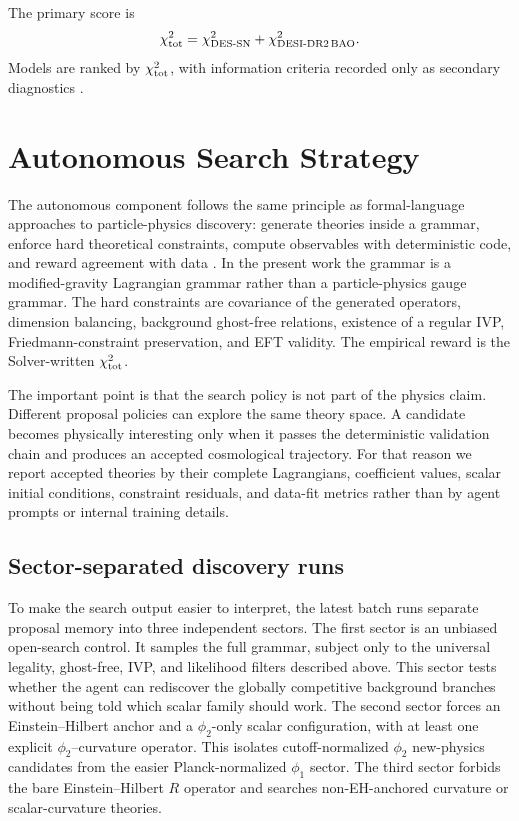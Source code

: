 \documentclass[aps,prd,twocolumn,superscriptaddress,nofootinbib,longbibliography]{revtex4-2}
\newcommand{\DES}{\mathrm{DES}}
\newcommand{\DESI}{\mathrm{DESI}}
\newcommand{\SN}{\mathrm{SN}}
\newcommand{\BAO}{\mathrm{BAO}}
\newcommand{\chiT}{\chi^2_{\rm tot}}
\begin{document}
The primary score is
\begin{equation}
\chiT=\chi^2_{\DES\text{-}\SN}+\chi^2_{\DESI\text{-DR2}\,\BAO}.
\label{eq:chi2}
\end{equation}
Models are ranked by $\chiT$, with information criteria recorded only as secondary diagnostics \cite{Akaike1974,Schwarz1978}.

\section{Autonomous Search Strategy}
\label{sec:search}

The autonomous component follows the same principle as formal-language approaches to particle-physics discovery: generate theories inside a grammar, enforce hard theoretical constraints, compute observables with deterministic code, and reward agreement with data \cite{Alexander2026Albert}.  In the present work the grammar is a modified-gravity Lagrangian grammar rather than a particle-physics gauge grammar.  The hard constraints are covariance of the generated operators, dimension balancing, background ghost-free relations, existence of a regular IVP, Friedmann-constraint preservation, and EFT validity.  The empirical reward is the Solver-written $\chiT$.

The important point is that the search policy is not part of the physics claim.  Different proposal policies can explore the same theory space.  A candidate becomes physically interesting only when it passes the deterministic validation chain and produces an accepted cosmological trajectory.  For that reason we report accepted theories by their complete Lagrangians, coefficient values, scalar initial conditions, constraint residuals, and data-fit metrics rather than by agent prompts or internal training details.

\subsection{Sector-separated discovery runs}
\label{subsec:sector-separated-search}

To make the search output easier to interpret, the latest batch runs separate proposal memory into three independent sectors.  The first sector is an unbiased open-search control.  It samples the full grammar, subject only to the universal legality, ghost-free, IVP, and likelihood filters described above.  This sector tests whether the agent can rediscover the globally competitive background branches without being told which scalar family should work.  The second sector forces an Einstein--Hilbert anchor and a $\phi_2$-only scalar configuration, with at least one explicit $\phi_2$--curvature operator.  This isolates cutoff-normalized $\phi_2$ new-physics candidates from the easier Planck-normalized $\phi_1$ sector.  The third sector forbids the bare Einstein--Hilbert $R$ operator and searches non-EH-anchored curvature or scalar-curvature theories.
\end{document}
